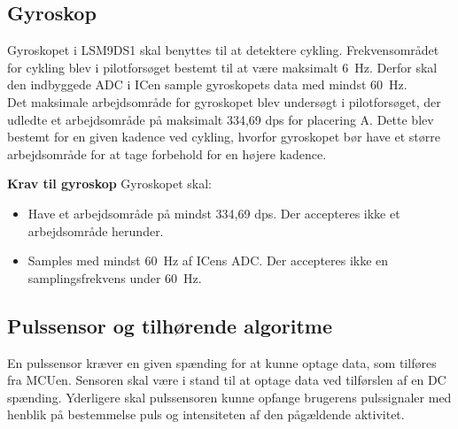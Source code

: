 \subsection{Gyroskop} \label{krav:gyro}
Gyroskopet i LSM9DS1 skal benyttes til at detektere cykling. Frekvensområdet for cykling blev i pilotforsøget bestemt til at være maksimalt 6~Hz. Derfor skal den indbyggede ADC i ICen sample gyroskopets data med mindst 60~Hz. \\
Det maksimale arbejdsområde for gyroskopet blev undersøgt i pilotforsøget, der udledte et arbejdsområde på maksimalt 334,69 dps for placering A. Dette blev bestemt for en given kadence ved cykling, hvorfor gyroskopet bør have et større arbejdsområde for at tage forbehold for en højere kadence. %

\textbf{Krav til gyroskop} \newline
Gyroskopet skal:
\begin{itemize}
\item Have et arbejdsområde på mindst 334,69 dps. Der accepteres ikke et arbejdsområde herunder.
\item Samples med mindst 60~Hz af ICens ADC. Der accepteres ikke en samplingsfrekvens under 60~Hz.
\end{itemize}

\subsection{Pulssensor og tilhørende algoritme} \label{puls_krav}   
En pulssensor kræver en given spænding for at kunne optage data, som tilføres fra MCUen. Sensoren skal være i stand til at optage data ved tilførslen af en DC spænding. %
Yderligere skal pulssensoren kunne opfange brugerens pulssignaler med henblik på bestemmelse puls og intensiteten af den pågældende aktivitet.

